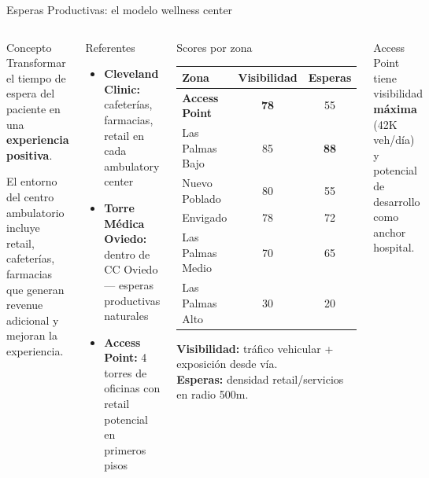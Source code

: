 \documentclass[aspectratio=169, 11pt]{beamer}
\begin{document}
\begin{frame}{Esperas Productivas: el modelo wellness center}

\begin{columns}[T]
\begin{block}{\small Concepto}
\footnotesize
Transformar el tiempo de espera del paciente en una \textbf{experiencia positiva}.

\vspace{3pt}
El entorno del centro ambulatorio incluye retail, cafeterías, farmacias que generan revenue adicional y mejoran la experiencia.
\end{block}

\vspace{4pt}
\begin{exampleblock}{\small Referentes}
\scriptsize
\begin{itemize}\setlength{\itemsep}{1pt}
  \item \textbf{Cleveland Clinic:} cafeterías, farmacias, retail en cada ambulatory center
  \item \textbf{Torre Médica Oviedo:} dentro de CC Oviedo --- esperas productivas naturales
  \item \textbf{Access Point:} 4 torres de oficinas con retail potencial en primeros pisos
\end{itemize}
\end{exampleblock}

\begin{block}{\small Scores por zona}
\scriptsize
\begin{tabular}{@{}lcc@{}}
\toprule
\textbf{Zona} & \textbf{Visibilidad} & \textbf{Esperas} \\
\midrule
\rowcolor{rose!10}
\textbf{Access Point} & \textcolor{rose}{\textbf{78}} & 55 \\
\rowcolor{teal!8}
Las Palmas Bajo & 85 & \textbf{88} \\
Nuevo Poblado & 80 & 55 \\
Envigado & 78 & 72 \\
Las Palmas Medio & 70 & 65 \\
\rowcolor{coral!8}
Las Palmas Alto & 30 & 20 \\
\bottomrule
\end{tabular}

\vspace{3pt}
{\tiny \textbf{Visibilidad:} tráfico vehicular + exposición desde vía.\\
\textbf{Esperas:} densidad retail/servicios en radio 500m.}
\end{block}

\vspace{4pt}
{\scriptsize Access Point tiene visibilidad \textbf{máxima} (42K veh/día) y potencial de desarrollo como anchor hospital.}
\end{columns}
\end{frame}
\end{document}

